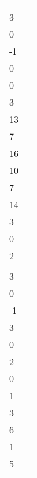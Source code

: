 \begin{applicationActivities}
\begin{activity}{10}
\begin{center}
\begin{tabular}{ll}
 &
     \(\vspan\left\{
    \begin{bmatrix}2\\3\\0\\-1\end{bmatrix},
    \begin{bmatrix}2\\0\\0\\3\end{bmatrix},
    \begin{bmatrix}3\\13\\7\\16\end{bmatrix},
    \begin{bmatrix}-1\\10\\7\\14\end{bmatrix},
    \begin{bmatrix}4\\3\\0\\2\end{bmatrix}
    \right\}
    \)
 \\
     \(\vspan\left\{
    \begin{bmatrix}2\\3\\0\\-1\end{bmatrix},
    \begin{bmatrix}4\\3\\0\\2\end{bmatrix},
    \begin{bmatrix}-3\\0\\1\\3\end{bmatrix},
    \begin{bmatrix}3\\6\\1\\5\end{bmatrix}
    \right\}
    \)


\end{tabular}
\end{center}
\end{activity}
\end{applicationActivities}
